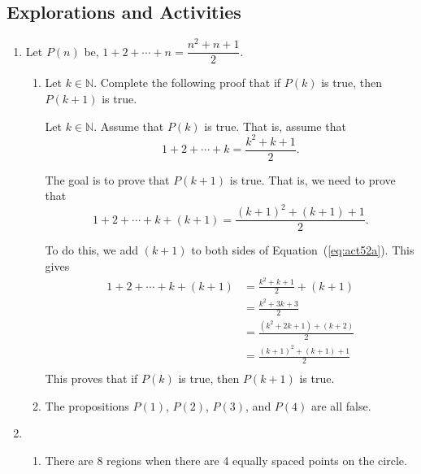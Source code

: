 \subsection*{Explorations and Activities}
\setcounter{oldenumi}{\theenumi}
\begin{enumerate} \setcounter{enumi}{\theoldenumi}
\item \setcounter{equation}{0}
Let  $P\left( n \right)$ be, $1 + 2 +  \cdots  + n = \dfrac{{n^2  + n + 1}}
{2}$.

\begin{enumerate}
\item Let  $k \in \mathbb{N}$.  Complete the following proof that if  $P\left( k \right)$ is true, then  $P\left( {k + 1} \right)$ is true.

Let  $k \in \mathbb{N}$.  Assume that  $P\left( k \right)$ is true.  That is, assume that
\begin{equation} \label{eq:act52a}
1 + 2 +  \cdots  + k = \frac{{k^2  + k + 1}}{2}.
\end{equation}

The goal is to prove that  $P\left( {k + 1} \right)$ is true.  That is, we need to prove that
\begin{equation} \label{eq:act52b}
1 + 2 +  \cdots  + k + \left( {k + 1} \right) = \frac{{\left( {k + 1} \right)^2  + \left( {k + 1} \right) + 1}}{2}.
\end{equation}

To do this, we add  $\left( {k + 1} \right)$ to both sides of Equation~(\ref{eq:act52a}).  This gives
\[
\begin{aligned}
  1 + 2 +  \cdots  + k + \left( {k + 1} \right) &= \frac{{k^2  + k + 1}}{2} + \left( {k + 1} \right) \\ 
               &= \frac{{k^2  + 3k + 3}}{2} \\ 
               &= \frac{{\left( {k^2  + 2k + 1} \right) + \left( {k + 2} \right)}}{2} \\ 
               &= \frac{{\left( {k + 1} \right)^2  + \left( {k + 1} \right) + 1}}{2} \\ 
\end{aligned}
\]
This proves that if  $P\left( k \right)$ is true, then  $P\left( {k + 1} \right)$ is true.

\item The propositions  $P\left( 1 \right)$, $P\left( 2 \right)$,  $P\left( 3 \right)$, and 
$P\left( 4 \right)$  are all false.
\end{enumerate}

\item \begin{enumerate}
\item There are 8 regions when there are 4 equally spaced points on the circle.


\end{enumerate}
\end{enumerate}
